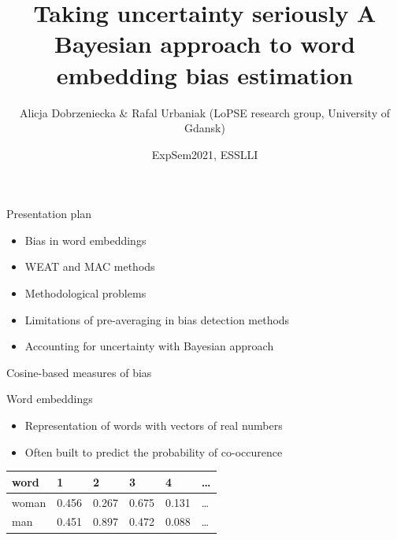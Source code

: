 \documentclass[10pt,ignorenonframetext,x11names, dvipsnames, bibspacing,natbib]{beamer}
\title{\Large Taking uncertainty seriously \newline \normalsize A Bayesian
approach to word embedding bias estimation}
\author{Alicja Dobrzeniecka \& Rafal Urbaniak \footnotesize \newline (LoPSE
research group, University of Gdansk)}
\date{ExpSem2021, ESSLLI}
\providecommand{\tightlist}{%
  \setlength{\itemsep}{0pt}\setlength{\parskip}{0pt}}
\begin{document}
\frame{\titlepage}

\begin{frame}{Presentation plan}
\protect\hypertarget{presentation-plan}{}

\begin{itemize}
\tightlist
\item
  Bias in word embeddings
\item
  WEAT and MAC methods
\item
  Methodological problems
\item
  Limitations of pre-averaging in bias detection methods
\item
  Accounting for uncertainty with Bayesian approach
\end{itemize}

\end{frame}

\begin{frame}{Cosine-based measures of bias}
\protect\hypertarget{cosine-based-measures-of-bias}{}

\begin{block}{Word embeddings}

\begin{itemize}
\item
  Representation of words with vectors of real numbers
\item
  Often built to predict the probability of co-occurence
\end{itemize}

\begin{longtable}[]{@{}llllll@{}}
\toprule
word & 1 & 2 & 3 & 4 & \ldots{}\tabularnewline
\midrule
\endhead
woman & 0.456 & 0.267 & 0.675 & 0.131 & \ldots{}\tabularnewline
man & 0.451 & 0.897 & 0.472 & 0.088 & \ldots{}\tabularnewline
\bottomrule
\end{longtable}

\end{block}

\end{frame}
\end{document}
